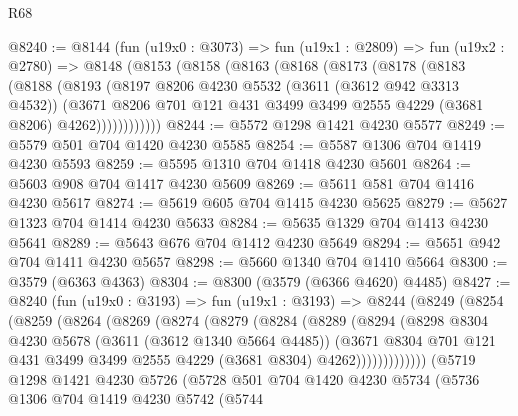 \begin{lexlean}{R68}
\begin{coremodule}
@8240 := @8144
    (fun (u19x0 : @3073) =>
    fun (u19x1 : @2809) =>
    fun (u19x2 : @2780) =>
    @8148
      (@8153
        (@8158
          (@8163
            (@8168
              (@8173
                (@8178
                  (@8183
                    (@8188
                      (@8193
                        (@8197
                          @8206
                          @4230
                          @5532
                          (@3611 (@3612 @942 @3313 @4532))
                          (@3671
                            @8206
                            @701
                            @121
                            @431
                            @3499
                            @3499
                            @2555
                            @4229
                            (@3681 @8206)
                            @4262))))))))))))
@8244 := @5572 @1298 @1421 @4230 @5577
@8249 := @5579 @501 @704 @1420 @4230 @5585
@8254 := @5587 @1306 @704 @1419 @4230 @5593
@8259 := @5595 @1310 @704 @1418 @4230 @5601
@8264 := @5603 @908 @704 @1417 @4230 @5609
@8269 := @5611 @581 @704 @1416 @4230 @5617
@8274 := @5619 @605 @704 @1415 @4230 @5625
@8279 := @5627 @1323 @704 @1414 @4230 @5633
@8284 := @5635 @1329 @704 @1413 @4230 @5641
@8289 := @5643 @676 @704 @1412 @4230 @5649
@8294 := @5651 @942 @704 @1411 @4230 @5657
@8298 := @5660 @1340 @704 @1410 @5664
@8300 := @3579 (@6363 @4363)
@8304 := @8300 (@3579 (@6366 @4620) @4485)
@8427 := @8240
    (fun (u19x0 : @3193) =>
    fun (u19x1 : @3193) =>
    @8244
      (@8249
        (@8254
          (@8259
            (@8264
              (@8269
                (@8274
                  (@8279
                    (@8284
                      (@8289
                        (@8294
                          (@8298
                            @8304
                            @4230
                            @5678
                            (@3611 (@3612 @1340 @5664 @4485))
                            (@3671
                              @8304
                              @701
                              @121
                              @431
                              @3499
                              @3499
                              @2555
                              @4229
                              (@3681 @8304)
                              @4262)))))))))))))
    (@5719
      @1298
      @1421
      @4230
      @5726
      (@5728
        @501
        @704
        @1420
        @4230
        @5734
        (@5736
          @1306
          @704
          @1419
          @4230
          @5742
          (@5744

\end{coremodule}
\end{lexlean}
